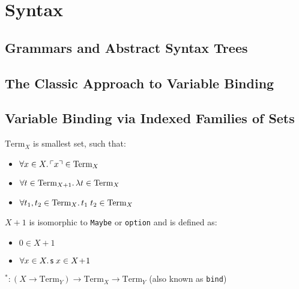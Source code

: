 \chapter{Syntax}

\section{Grammars and Abstract Syntax Trees}

\section{The Classic Approach to Variable Binding}

\section{Variable Binding via Indexed Families of Sets}

\newcommand\ITerm[1]{\mathrm{Term}_{#1}}
\newcommand\ITVar[1]{\ulcorner #1 \urcorner}
\newcommand\ITSucc{\mathsf{s}}
\newcommand\ITInc[1]{#1\!+\!1}

$\ITerm{X}$ is smallest set, such that:

\begin{itemize}
\item $\forall x \in X\ldotp \ITVar{x} \in \ITerm{X}$
\item $\forall t \in \ITerm{X+1}\ldotp \lambda t \in \ITerm{X}$
\item $\forall t_1, t_2 \in \ITerm{X}\ldotp t_1\;t_2 \in \ITerm{X}$
\end{itemize}

$\ITInc{X}$ is isomorphic to \texttt{Maybe} or \texttt{option}
and is defined as:

\begin{itemize}
\item $0 \in \ITInc{X}$
\item $\forall x \in X\ldotp \ITSucc\;x \in \ITInc{X}$
\end{itemize}

$^* \colon (X \to \ITerm{Y}) \to \ITerm{X} \to \ITerm{Y}$ (also known as \texttt{bind})

